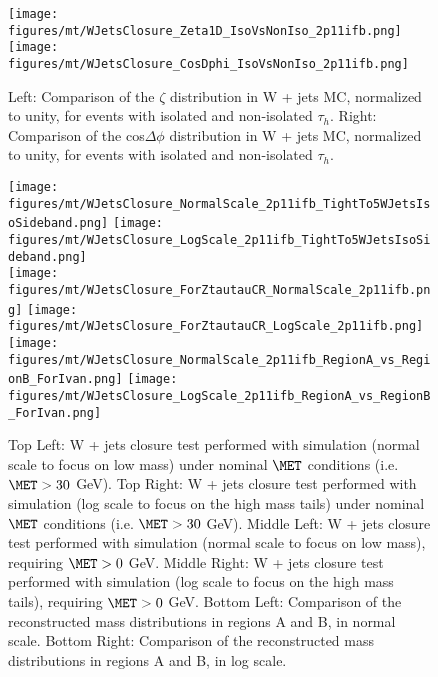 \begin{figure}\centering
  \texttt{[image: figures/mt/WJetsClosure\_Zeta1D\_IsoVsNonIso\_2p11ifb.png]}
  \texttt{[image: figures/mt/WJetsClosure\_CosDphi\_IsoVsNonIso\_2p11ifb.png]}
  \caption{\label{fig:ZetaAndCosDphiVsTauIso} Left: Comparison of the $\zeta$ distribution in W + jets MC, normalized to unity, for events with isolated and 
non-isolated $\tau_{h}$.  Right: Comparison of the cos$\Delta\phi$ distribution in W + jets MC, normalized to unity, for events with isolated and
non-isolated $\tau_{h}$.}
\end{figure}

\begin{figure}\centering
  \texttt{[image: figures/mt/WJetsClosure\_NormalScale\_2p11ifb\_TightTo5WJetsIsoSideband.png]}
  \texttt{[image: figures/mt/WJetsClosure\_LogScale\_2p11ifb\_TightTo5WJetsIsoSideband.png]} \\
  \texttt{[image: figures/mt/WJetsClosure\_ForZtautauCR\_NormalScale\_2p11ifb.png]}
  \texttt{[image: figures/mt/WJetsClosure\_ForZtautauCR\_LogScale\_2p11ifb.png]} \\
  \texttt{[image: figures/mt/WJetsClosure\_NormalScale\_2p11ifb\_RegionA\_vs\_RegionB\_ForIvan.png]}
  \texttt{[image: figures/mt/WJetsClosure\_LogScale\_2p11ifb\_RegionA\_vs\_RegionB\_ForIvan.png]}
  \caption{\label{fig:wJetsClosureMuTau} Top Left: W + jets closure test performed with simulation (normal scale to focus on low mass) under nominal $\MET$ 
conditions (i.e. $\MET > 30$ GeV).  Top Right: 
W + jets closure test performed with simulation (log scale to focus on the high mass tails) under nominal $\MET$
conditions (i.e. $\MET > 30$ GeV).  Middle Left: W + jets closure test performed 
with simulation (normal scale to focus on low mass), requiring $\MET > 0$ GeV.  Middle Right: W + jets closure test performed with simulation (log scale to 
focus on the high mass tails), requiring $\MET > 0$ GeV.  Bottom Left: Comparison of the reconstructed mass distributions in regions A and B, in normal scale.  
Bottom Right: Comparison of the reconstructed mass distributions in regions A and B, in log scale.} 
\end{figure}

